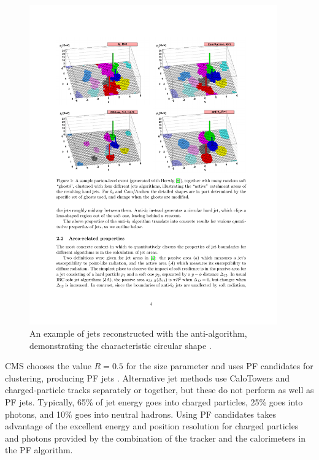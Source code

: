 \begin{figure}[hbt]
\begin{center}
\includegraphics[width=0.95\textwidth]{figures/08021189v2-fig.pdf}
\caption{An example of jets reconstructed with the anti-\kt algorithm, demonstrating the characteristic circular shape \cite{Cacciari:2008gp}.}
\label{fig:ak5-example}
\end{center}
\end{figure}

CMS chooses the value $R = 0.5$ for the size parameter and uses PF candidates for clustering, producing PF jets \cite{CMS-PAS-PFT-09-001, CMS-PAS-PFT-10-002}. Alternative jet methods use CaloTowers and charged-particle tracks separately or together, but these do not perform as well as PF jets. Typically, 65\% of jet energy goes into charged particles, 25\% goes into photons, and 10\% goes into neutral hadrons. Using PF candidates takes advantage of the excellent energy and position resolution for charged particles and photons provided by the combination of the tracker and the calorimeters in the PF algorithm.

